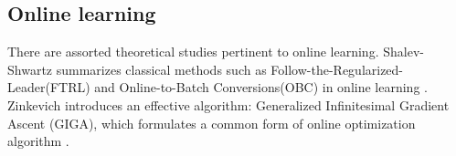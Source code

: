 \documentclass[10pt,conference,compsocconf,letterpaper]{IEEEtran}
\begin{document}
\subsection{Online learning}

There are assorted theoretical studies pertinent to online learning. Shalev-Shwartz summarizes classical methods such as Follow-the-Regularized-Leader(FTRL) and Online-to-Batch Conversions(OBC) in online learning  \cite{shalev2011online}. %
Zinkevich introduces an effective algorithm: Generalized Infinitesimal Gradient Ascent (GIGA), which formulates a common form of online optimization algorithm \cite{zinkevich2003online}. 
\end{document}
